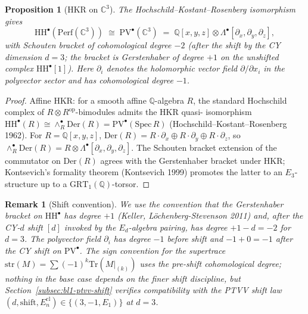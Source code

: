 \documentclass[11pt]{article}
\newtheorem{proposition}[theorem]{Proposition}
\newtheorem{remark}[theorem]{Remark}
\providecommand{\HH}{\mathrm{HH}}
\providecommand{\Perf}{\mathrm{Perf}}
\providecommand{\PV}{\mathrm{PV}}
\providecommand{\PVbullet}{\mathrm{PV}^{\bullet}}
\providecommand{\C}{\mathbb{C}}
\providecommand{\QQ}{\mathbb{Q}}
\providecommand{\Q}{\mathbb{Q}}
\providecommand{\str}{\mathrm{str}}
\providecommand{\Tr}{\mathrm{Tr}}
\begin{document}
\begin{proposition}[HKR on $\C^3$]
\label{prop:bl1-hkr-c3}
The Hochschild--Kostant--Rosenberg isomorphism gives
\begin{equation}
\label{eq:bl1-hkr-c3}
  \HH^\bullet(\Perf(\C^3))
  \;\cong\; \PV^\bullet(\C^3)
  \;=\; \Q[x, y, z] \otimes \Lambda^\bullet[\partial_x, \partial_y, \partial_z],
\end{equation}
with Schouten bracket of cohomological degree $-2$ (after the shift by
the CY dimension $d = 3$; the bracket is Gerstenhaber of degree $+1$ on
the \emph{un}shifted complex $\HH^\bullet[1]$). Here $\partial_i$ denotes
the holomorphic vector field $\partial / \partial x_i$ in the polyvector
sector and has cohomological degree $-1$.
\end{proposition}

\begin{proof}
Affine HKR: for a smooth affine $\QQ$-algebra $R$, the standard Hochschild
complex of $R \otimes R^{\mathrm{op}}$-bimodules admits the HKR quasi-
isomorphism $\HH^\bullet(R) \cong \wedge^\bullet_R \mathrm{Der}(R) =
\PV^\bullet(\mathrm{Spec}\, R)$ (Hochschild--Kostant--Rosenberg 1962).
For $R = \QQ[x, y, z]$, $\mathrm{Der}(R) = R \cdot \partial_x \oplus R \cdot
\partial_y \oplus R \cdot \partial_z$, so
$\wedge^\bullet_R \mathrm{Der}(R) = R \otimes \Lambda^\bullet[\partial_x,
\partial_y, \partial_z]$. The Schouten bracket extension of the
commutator on $\mathrm{Der}(R)$ agrees with the Gerstenhaber bracket
under HKR; Kontsevich's formality theorem (Kontsevich 1999) promotes
the latter to an $E_3$-structure up to a $\mathrm{GRT}_1(\Q)$-torsor.
\end{proof}

\begin{remark}[Shift convention]
\label{rem:bl1-shift-convention}
We use the convention that the Gerstenhaber bracket on $\HH^\bullet$
has degree $+1$ (Keller, L\"ochenberg\--Stevenson 2011) and, after the
CY-$d$ shift $[d]$ invoked by the $E_d$-algebra pairing, has degree
$+1 - d = -2$ for $d = 3$. The polyvector field $\partial_i$ has
degree $-1$ before shift and $-1 + 0 = -1$ after the CY shift on
$\PVbullet$. The sign convention for the supertrace
$\str(M) = \sum (-1)^k \Tr(M|_{(k)})$ uses the pre-shift cohomological
degree; nothing in the base case depends on the finer shift discipline,
but Section~\ref{subsec:bl1-ptvv-shift} verifies compatibility with
the PTVV shift law $(d, \mathrm{shift}, E_n^{\mathrm{cl}})
\in \{(3,-1,E_1)\}$ at $d = 3$.
\end{remark}
\end{document}
